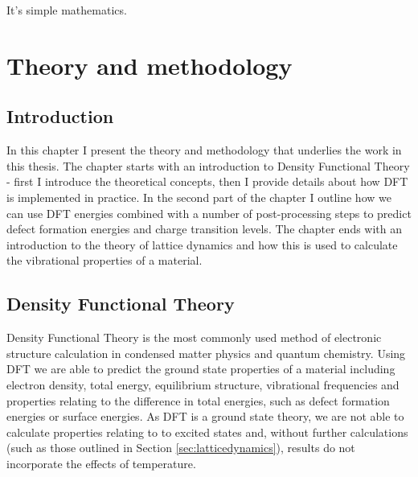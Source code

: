 \begin{savequote}[8cm]
It's simple mathematics.
\end{savequote}

\chapter{\label{ch:3-methods}Theory and methodology}

\minitoc



\section{Introduction} 

In this chapter I present the theory and methodology that underlies the work in this thesis. The chapter starts with an introduction to Density Functional Theory - first I introduce the theoretical concepts, then I provide details about how DFT is implemented in practice. In the second part of the chapter I outline how we can use DFT energies combined with a number of post-processing steps to predict defect formation energies and charge transition levels. The chapter ends with an introduction to the theory of lattice dynamics and how this is used to calculate the vibrational properties of a material. 

\section{Density Functional Theory} \label{DFTtheory}

Density Functional Theory is the most commonly used method of electronic structure calculation in condensed matter physics and quantum chemistry. 
Using DFT we are able to predict the ground state properties of a material including electron density, total energy, equilibrium structure, vibrational frequencies and properties relating to the difference in total energies, such as defect formation energies or surface energies. 
As DFT is a ground state theory, we are not able to calculate properties relating to to excited states and, without further calculations (such as those outlined in Section \ref{sec:latticedynamics}), results do not incorporate the effects of temperature. 

